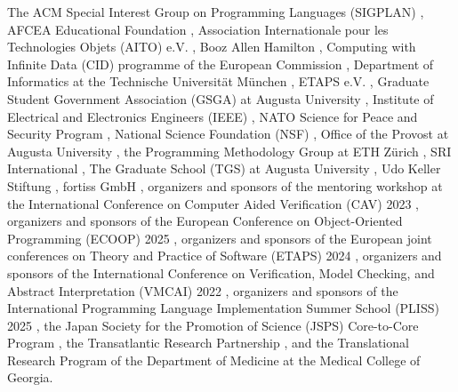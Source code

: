 The ACM Special Interest Group on Programming Languages (SIGPLAN)%
, AFCEA Educational Foundation%
, Association Internationale pour les Technologies Objets (AITO) e.V.%
, Booz Allen Hamilton%
, Computing with Infinite Data (CID) programme of the European Commission%
, Department of Informatics at the Technische Universität München%
, ETAPS e.V.%
, Graduate Student Government Association (GSGA) at Augusta University%
, Institute of Electrical and Electronics Engineers (IEEE)%
, NATO Science for Peace and Security Program%
, National Science Foundation (NSF)%
, Office of the Provost at Augusta University%
, the Programming Methodology Group at ETH Zürich%
, SRI International%
, The Graduate School (TGS) at Augusta University%
, Udo Keller Stiftung%
, fortiss GmbH%
, organizers and sponsors of the mentoring workshop at the International Conference on Computer Aided Verification (CAV) 2023%
, organizers and sponsors of the European Conference on Object-Oriented Programming (ECOOP) 2025%
, organizers and sponsors of the European joint conferences on Theory and Practice of Software (ETAPS) 2024%
, organizers and sponsors of the International Conference on Verification, Model Checking, and Abstract Interpretation (VMCAI) 2022%
, organizers and sponsors of the International Programming Language Implementation Summer School (PLISS) 2025%
, the Japan Society for the Promotion of Science (JSPS) Core-to-Core Program%
, the Transatlantic Research Partnership%
, and the Translational Research Program of the Department of Medicine at the Medical College of Georgia.

